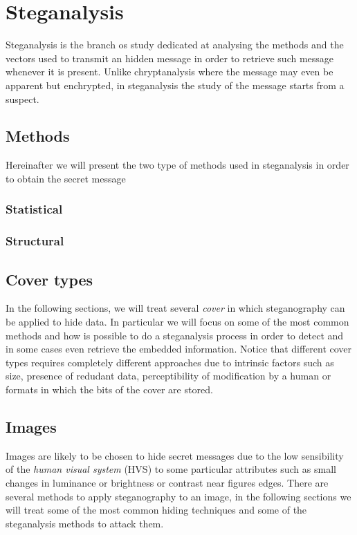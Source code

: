 \documentclass[../../main.tex]{subfiles}
\begin{document}
    
    \section{Steganalysis}
    Steganalysis is the branch os study dedicated at analysing the methods and
    the vectors used to transmit an hidden message in order to retrieve such
    message whenever it is present.
    Unlike chryptanalysis where the message may even be apparent but enchrypted,
    in steganalysis the study of the message starts from a suspect.
    \subsection{Methods}
    Hereinafter we will present the two type of methods used in steganalysis in
    order to obtain the secret message 

    \subsubsection{Statistical}

    \subsubsection{Structural}

    \subsection{Cover types}
    In the following sections, we will treat several \emph{cover} in which
    steganography can be applied to hide data.
    In particular we will focus on some of the most common methods and how is
    possible to do a steganalysis process in order to detect and in some cases
    even retrieve the embedded information.
    Notice that different cover types requires completely different approaches
    due to intrinsic factors such as size, presence of redudant data,
    perceptibility of modification by a human or formats in which the bits of
    the cover are stored.


    \subsection{Images}
    Images are likely to be chosen to hide secret messages due to the low
    sensibility of the \emph{human visual system} (HVS) to some particular
    attributes such as small changes in luminance or brightness or contrast near
    figures edges.
    There are several methods to apply steganography to an image, in the
    following sections we will treat some of the most common hiding techniques
    and some of the steganalysis methods to attack them.
\end{document}
